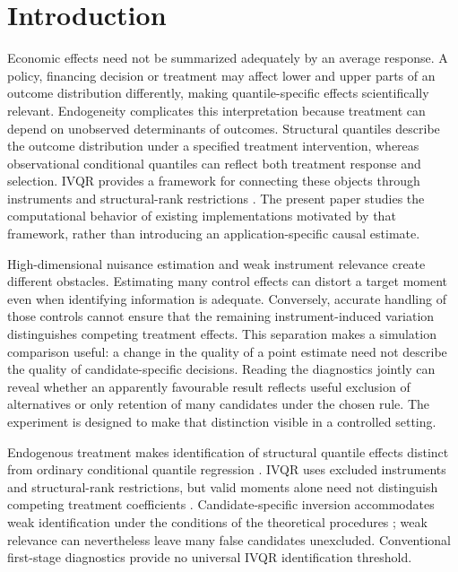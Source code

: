 \section{Introduction}
Economic effects need not be summarized adequately by an average response. A policy, financing decision or treatment may affect lower and upper parts of an outcome distribution differently, making quantile-specific effects scientifically relevant. Endogeneity complicates this interpretation because treatment can depend on unobserved determinants of outcomes. Structural quantiles describe the outcome distribution under a specified treatment intervention, whereas observational conditional quantiles can reflect both treatment response and selection. IVQR provides a framework for connecting these objects through instruments and structural-rank restrictions \parencite{chernozhukov_hansen_2005,chernozhukov_hansen_2013}. The present paper studies the computational behavior of existing implementations motivated by that framework, rather than introducing an application-specific causal estimate.

High-dimensional nuisance estimation and weak instrument relevance create different obstacles. Estimating many control effects can distort a target moment even when identifying information is adequate. Conversely, accurate handling of those controls cannot ensure that the remaining instrument-induced variation distinguishes competing treatment effects. This separation makes a simulation comparison useful: a change in the quality of a point estimate need not describe the quality of candidate-specific decisions. Reading the diagnostics jointly can reveal whether an apparently favourable result reflects useful exclusion of alternatives or only retention of many candidates under the chosen rule. The experiment is designed to make that distinction visible in a controlled setting.

Endogenous treatment makes identification of structural quantile effects distinct from ordinary conditional quantile regression \parencite{koenker_bassett_1978,chernozhukov_hansen_2005}. IVQR uses excluded instruments and structural-rank restrictions, but valid moments alone need not distinguish competing treatment coefficients \parencite{chernozhukov_hansen_wuthrich_2017}. Candidate-specific inversion accommodates weak identification under the conditions of the theoretical procedures \parencite{chernozhukov_hansen_2008}; weak relevance can nevertheless leave many false candidates unexcluded. Conventional first-stage diagnostics provide no universal IVQR identification threshold.

